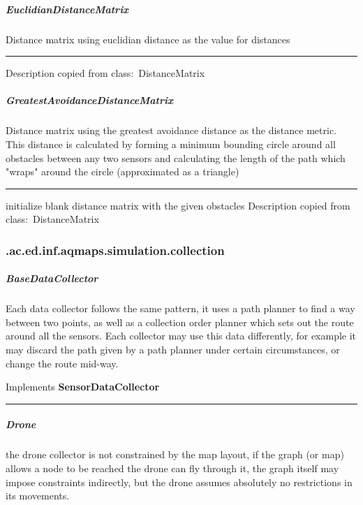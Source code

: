 \subparagraph{ EuclidianDistanceMatrix } Distance matrix using euclidian distance as the value for distances
 
\hrule
\begin{mitem}
\scriptsize
	{}
	{Description copied from class:~DistanceMatrix}
\end{mitem}

\subparagraph{ GreatestAvoidanceDistanceMatrix } Distance matrix using the greatest avoidance distance as the distance metric. This distance is calculated by forming a minimum bounding circle around all obstacles
 between any two sensors and calculating the length of the path which "wraps" around the circle (approximated as a triangle)
 
\hrule
\begin{mitem}
\scriptsize
	{initialize blank distance matrix with the given obstacles}
	{Description copied from class:~DistanceMatrix}
\end{mitem}

\subsubsection{ .ac.ed.inf.aqmaps.simulation.collection }
\subparagraph{ BaseDataCollector } Each data collector follows the same pattern, it uses a path planner to find a way between two points, as well as a collection order planner which
 sets out the route around all the sensors. Each collector may use this data differently, for example it may discard the path given by a path planner under certain circumstances,
 or change the route mid-way.
 
Implements \textbf{ SensorDataCollector }
\hrule
\begin{mitem}
\scriptsize
	{}
\end{mitem}

\subparagraph{ Drone } the drone collector is not constrained by the map layout, if the graph (or map) allows a node to be reached
 the drone can fly through it, the graph itself may impose constraints indirectly, but the drone assumes absolutely no restrictions in its movements.
 
